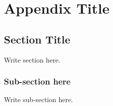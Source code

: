 \chapter{Appendix Title}
\label{AppendixA}
\small

\section{Section Title}
Write section here.

\subsection{Sub-section here}
Write sub-section here.